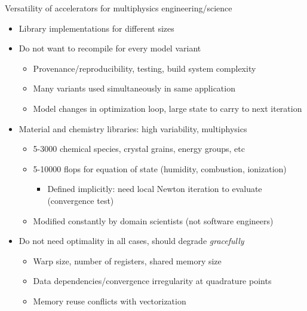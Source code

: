 \documentclass{beamer}
\begin{document}
\begin{frame}{Versatility of accelerators for multiphysics engineering/science}
  \begin{itemize}
  \item Library implementations for different sizes
  \item Do not want to recompile for every model variant
    \begin{itemize}
    \item Provenance/reproducibility, testing, build system complexity
    \item Many variants used simultaneously in same application
    \item Model changes in optimization loop, large state to carry to next iteration
    \end{itemize}
  \item Material and chemistry libraries: high variability, multiphysics
    \begin{itemize}
    \item 5-3000 chemical species, crystal grains, energy groups, etc
    \item 5-10000 flops for equation of state (humidity, combustion, ionization)
      \begin{itemize}
      \item Defined implicitly: need local Newton iteration to evaluate (convergence test)
      \end{itemize}
    \item Modified constantly by domain scientists (not software engineers)
    \end{itemize}
  \item Do not need optimality in all cases, should degrade \emph{gracefully}
    \begin{itemize}
    \item Warp size, number of registers, shared memory size
    \item Data dependencies/convergence irregularity at quadrature points
    \item Memory reuse conflicts with vectorization
    \end{itemize}
  \end{itemize}
\end{frame}
\end{document}
